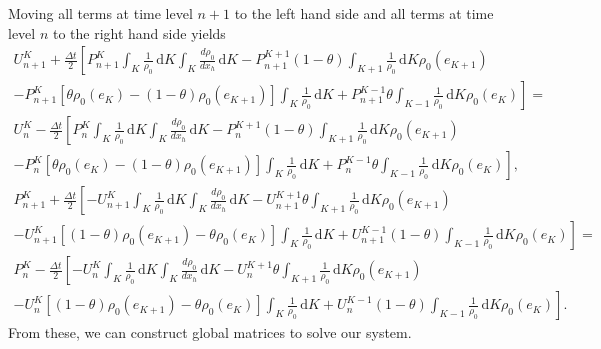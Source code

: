 \documentclass{article}
\begin{document}
Moving all terms at time level $n+1$ to the left hand side and all terms at time level $n$ to the right hand side yields
\begin{equation}
	\begin{aligned}
		U^K_{n+1} + \frac{\Delta t}{2} \left[ P^K_{n+1} \int_K \! \frac{1}{\rho_0} \, \mathrm{d}K \int_K \! \frac{d \rho_0}{d x_h} \, \mathrm{d}K - P^{K+1}_{n+1} (1-\theta) \int_{K+1} \! \frac{1}{\rho_0} \, \mathrm{d}K \rho_0(e_{K+1}) \right. \\
		\left. - P^K_{n+1} [\theta \rho_0(e_K) - (1-\theta) \rho_0(e_{K+1})] \int_K \! \frac{1}{\rho_0} \, \mathrm{d}K + P^{K-1}_{n+1} \theta \int_{K-1} \! \frac{1}{\rho_0} \, \mathrm{d}K \rho_0(e_K)\right] = \\
	U^K_{n} - \frac{\Delta t}{2} \left[ P^K_{n} \int_K \! \frac{1}{\rho_0} \, \mathrm{d}K \int_K \! \frac{d \rho_0}{d x_h} \, \mathrm{d}K - P^{K+1}_{n} (1-\theta) \int_{K+1} \! \frac{1}{\rho_0} \, \mathrm{d}K \rho_0(e_{K+1}) \right. \\
		\left. - P^K_{n} [\theta \rho_0(e_K) - (1-\theta) \rho_0(e_{K+1})] \int_K \! \frac{1}{\rho_0} \, \mathrm{d}K + P^{K-1}_{n} \theta \int_{K-1} \! \frac{1}{\rho_0} \, \mathrm{d}K \rho_0(e_K)\right], \\
	P^K_{n+1} + \frac{\Delta t}{2} \left[- U^K_{n+1} \int_K \! \frac{1}{\rho_0} \, \mathrm{d}K   \int_K \! \frac{d \rho_0}{d x_h} \, \mathrm{d}K		 - U^{K+1}_{n+1} \theta \int_{K+1} \! \frac{1}{\rho_0} \, \mathrm{d}K \rho_0(e_{K+1}) \right. \\
	\left. - U^K_{n+1} [(1-\theta) \rho_0(e_{K+1}) - \theta \rho_0(e_K)] \int_K \! \frac{1}{\rho_0} \, \mathrm{d}K + U^{K-1}_{n+1}  (1-\theta) \int_{K-1} \! \frac{1}{\rho_0} \, \mathrm{d}K \rho_0(e_K) \right] = \\
	P^K_{n} - \frac{\Delta t}{2} \left[- U^K_{n} \int_K \! \frac{1}{\rho_0} \, \mathrm{d}K   \int_K \! \frac{d \rho_0}{d x_h} \, \mathrm{d}K		 - U^{K+1}_{n} \theta \int_{K+1} \! \frac{1}{\rho_0} \, \mathrm{d}K \rho_0(e_{K+1}) \right. \\
	\left. - U^K_{n} [(1-\theta) \rho_0(e_{K+1}) - \theta \rho_0(e_K)] \int_K \! \frac{1}{\rho_0} \, \mathrm{d}K + U^{K-1}_{n}  (1-\theta) \int_{K-1} \! \frac{1}{\rho_0} \, \mathrm{d}K \rho_0(e_K) \right].
	\end{aligned}
\end{equation}
From these, we can construct global matrices to solve our system.
\end{document}
